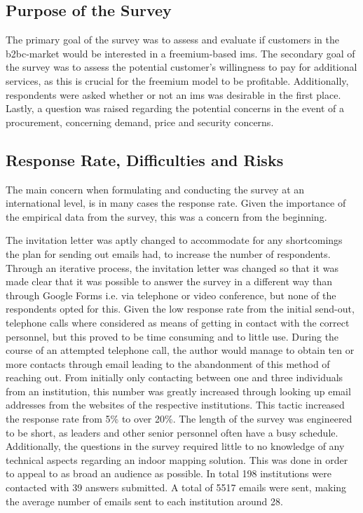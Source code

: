 \subsection{Purpose of the Survey}
The primary goal of the survey was to assess and evaluate if customers in the \gls{b2bc}-market would be interested in a freemium-based \gls{ims}. The secondary goal of the survey was to assess the potential customer's willingness to pay for additional services, as this is crucial for the freemium model to be profitable. Additionally, respondents were asked whether or not an \gls{ims} was desirable in the first place. Lastly, a question was raised regarding the potential concerns in the event of a procurement, concerning demand, price and security concerns.

\subsection{Response Rate, Difficulties and Risks}
The main concern when formulating and conducting the survey at an international level, is in many cases the response rate. Given the importance of the empirical data from the survey, this was a concern from the beginning. 


The invitation letter was aptly changed to accommodate for any shortcomings the plan for sending out emails had, to increase the number of respondents. Through an iterative process, the invitation letter was changed so that it was made clear that it was possible to answer the survey in a different way than through Google Forms i.e. via telephone or video conference, but none of the respondents opted for this. Given the low response rate from the initial send-out, telephone calls where considered as means of getting in contact with the correct personnel, but this proved to be time consuming and to little use. During the course of an attempted telephone call, the author would manage to obtain ten or more contacts through email leading to the abandonment of this method of reaching out. From initially only contacting between one and three individuals from an institution, this number was greatly increased through looking up email addresses from the websites of the respective institutions. This tactic increased the response rate from 5\% to over 20\%.  The length of the survey was engineered to be short, as leaders and other senior personnel often have a busy schedule. Additionally, the questions in the survey required little to no knowledge of any technical aspects regarding an indoor mapping solution. This was done in order to appeal to as broad an audience as possible. In total 198 institutions were contacted with 39 answers submitted. A total of 5517 emails were sent, making the average number of emails sent to each institution around 28. 

